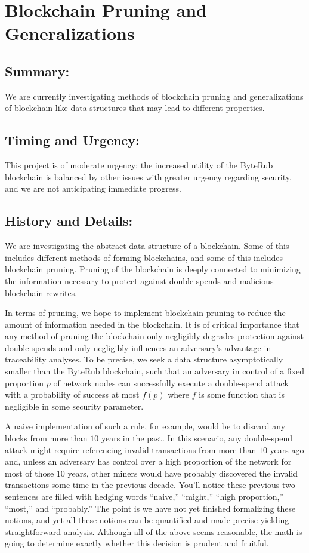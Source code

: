 \documentclass[12pt,english]{mrl}
\theoremstyle{definition}
\numberwithin{equation}{section}
\numberwithin{figure}{section}
\numberwithin{equation}{section}
\numberwithin{equation}{section}
\numberwithin{figure}{section}
\begin{document}
\section{Blockchain Pruning and Generalizations}

\subsection{Summary:} 

We are currently investigating methods of blockchain pruning and generalizations of blockchain-like data structures that may lead to different properties. 

\subsection{Timing and Urgency:} 

This project is of moderate urgency; the increased utility of the ByteRub blockchain is balanced by other issues with greater urgency regarding security, and we are not anticipating immediate progress.

\subsection{History and Details:} 

We are investigating the abstract data structure of a blockchain. Some of this includes different methods of forming blockchains, and some of this includes blockchain pruning. Pruning of the blockchain is deeply connected to minimizing the information necessary to protect against double-spends and malicious blockchain rewrites.

In terms of pruning, we hope to implement blockchain pruning to reduce the amount of information needed in the blockchain. It is of critical importance that any method of pruning the blockchain only negligibly degrades protection against double spends and only negligibly influences an adversary's advantage in traceability analyses. To be precise, we seek a data structure asymptotically smaller than the ByteRub blockchain, such that an adversary in control of a fixed proportion $p$ of network nodes can successfully execute a double-spend attack with a probability of success at most $f(p)$ where $f$ is some function that is negligible in some security parameter. 

A naive implementation of such a rule, for example, would be to discard any blocks from more than $10$ years in the past. In this scenario, any double-spend attack might require referencing invalid transactions from more than $10$ years ago and, unless an adversary has control over a high proportion of the network for most of those $10$ years, other miners would have probably discovered the invalid transactions some time in the previous decade. You'll notice these previous two sentences are filled with hedging words ``naive,'' ``might,'' ``high proportion,'' ``most,'' and ``probably.'' The point is we have not yet finished formalizing these notions, and yet all these notions can be quantified and made precise yielding straightforward analysis. Although all of the above seems reasonable, the math is going to determine exactly whether this decision is prudent and fruitful.
\end{document}
